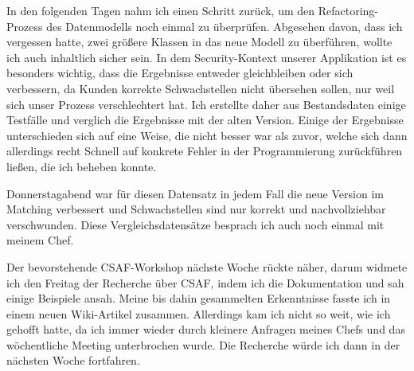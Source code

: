 \sweekdaymarginpar{\weekdayWednesdayShort, \weekdayThursdayShort}

In den folgenden Tagen nahm ich einen Schritt zurück, um den Refactoring-Prozess des Datenmodells noch einmal zu überprüfen.
Abgesehen davon, dass ich vergessen hatte, zwei größere Klassen in das neue Modell zu überführen, wollte ich auch inhaltlich sicher sein.
In dem Security-Kontext unserer Applikation ist es besonders wichtig, dass die Ergebnisse entweder gleichbleiben oder sich verbessern, da Kunden korrekte Schwachstellen nicht übersehen sollen, nur weil sich unser Prozess verschlechtert hat.
Ich erstellte daher aus Bestandsdaten einige Testfälle und verglich die Ergebnisse mit der alten Version.
Einige der Ergebnisse unterschieden sich auf eine Weise, die nicht besser war als zuvor, welche sich dann allerdings recht Schnell auf konkrete Fehler in der Programmierung zurückführen ließen, die ich beheben konnte.

Donnerstagabend war für diesen Datensatz in jedem Fall die neue Version im Matching verbessert und Schwachstellen sind nur korrekt und nachvollziehbar verschwunden.
Diese Vergleichsdatensätze besprach ich auch noch einmal mit meinem Chef.

\sweekdaymarginpar{\weekdayFridayLong}

Der bevorstehende CSAF-Workshop nächste Woche rückte näher, darum widmete ich den Freitag der Recherche über CSAF, indem ich die Dokumentation und sah einige Beispiele ansah.
Meine bis dahin gesammelten Erkenntnisse fasste ich in einem neuen Wiki-Artikel zusammen.
Allerdings kam ich nicht so weit, wie ich gehofft hatte, da ich immer wieder durch kleinere Anfragen meines Chefs und das wöchentliche Meeting unterbrochen wurde.
Die Recherche würde ich dann in der nächsten Woche fortfahren.
